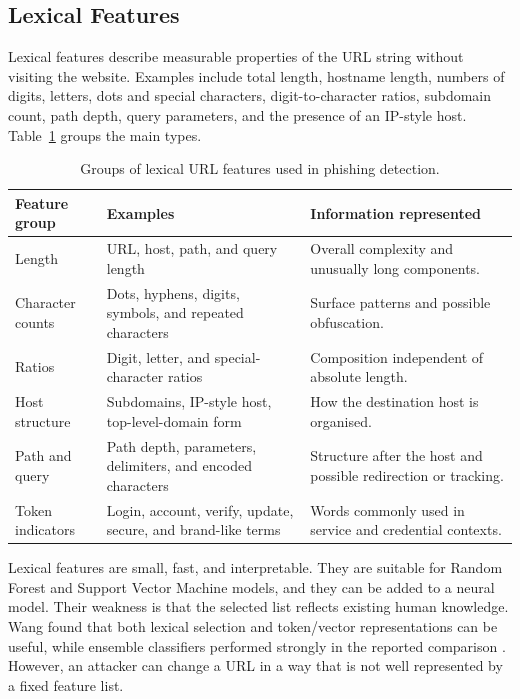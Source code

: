 \subsection{Lexical Features}

Lexical features describe measurable properties of the URL string without
visiting the website. Examples include total length, hostname length, numbers of
digits, letters, dots and special characters, digit-to-character ratios,
subdomain count, path depth, query parameters, and the presence of an IP-style
host. Table~\ref{tab:background-feature-groups} groups the main types.

\begin{table}[htbp]
\centering
\caption{Groups of lexical URL features used in phishing detection.}
\label{tab:background-feature-groups}
\small
\begin{tabular}{@{}p{}p{}p{}@{}}
\toprule
Feature group & Examples & Information represented \\
\midrule
Length & URL, host, path, and query length & Overall complexity and unusually long components. \\
Character counts & Dots, hyphens, digits, symbols, and repeated characters & Surface patterns and possible obfuscation. \\
Ratios & Digit, letter, and special-character ratios & Composition independent of absolute length. \\
Host structure & Subdomains, IP-style host, top-level-domain form & How the destination host is organised. \\
Path and query & Path depth, parameters, delimiters, and encoded characters & Structure after the host and possible redirection or tracking. \\
Token indicators & Login, account, verify, update, secure, and brand-like terms & Words commonly used in service and credential contexts. \\
\bottomrule
\end{tabular}
\end{table}

Lexical features are small, fast, and interpretable. They are suitable for
Random Forest and Support Vector Machine models, and they can be added to a
neural model. Their weakness is that the selected list reflects existing human
knowledge. Wang found that both lexical selection and token/vector
representations can be useful, while ensemble classifiers performed strongly in
the reported comparison \citep{wang2022malicious}. However, an attacker can
change a URL in a way that is not well represented by a fixed feature list.

